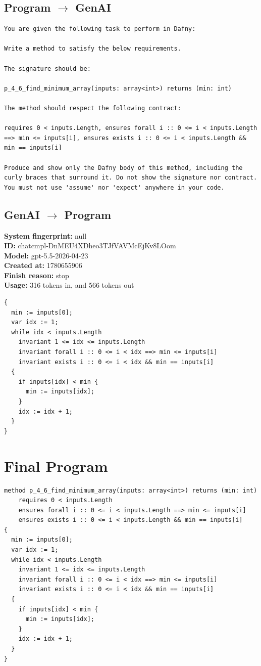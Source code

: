 \documentclass{article}
\begin{document}
\subsection*{Program $\rightarrow$ GenAI}
\begin{lstlisting}
You are given the following task to perform in Dafny:

Write a method to satisfy the below requirements.

The signature should be:

p_4_6_find_minimum_array(inputs: array<int>) returns (min: int)

The method should respect the following contract:

requires 0 < inputs.Length, ensures forall i :: 0 <= i < inputs.Length ==> min <= inputs[i], ensures exists i :: 0 <= i < inputs.Length && min == inputs[i]

Produce and show only the Dafny body of this method, including the curly braces that surround it. Do not show the signature nor contract. You must not use 'assume' nor 'expect' anywhere in your code.
\end{lstlisting}
\subsection*{GenAI $\rightarrow$ Program}
\textbf{System fingerprint: }null
\\\textbf{ID: }chatcmpl-DnMEU4XDheo3TJfVAVMcEjKv8LOom
\\\textbf{Model: }gpt-5.5-2026-04-23
\\\textbf{Created at: }1780655906
\\\textbf{Finish reason: }stop
\\\textbf{Usage: }316 tokens in, and 566 tokens out
\begin{lstlisting}
{
  min := inputs[0];
  var idx := 1;
  while idx < inputs.Length
    invariant 1 <= idx <= inputs.Length
    invariant forall i :: 0 <= i < idx ==> min <= inputs[i]
    invariant exists i :: 0 <= i < idx && min == inputs[i]
  {
    if inputs[idx] < min {
      min := inputs[idx];
    }
    idx := idx + 1;
  }
}
\end{lstlisting}
\section*{Final Program}
\begin{lstlisting}
method p_4_6_find_minimum_array(inputs: array<int>) returns (min: int)
	requires 0 < inputs.Length
	ensures forall i :: 0 <= i < inputs.Length ==> min <= inputs[i]
	ensures exists i :: 0 <= i < inputs.Length && min == inputs[i]
{
  min := inputs[0];
  var idx := 1;
  while idx < inputs.Length
    invariant 1 <= idx <= inputs.Length
    invariant forall i :: 0 <= i < idx ==> min <= inputs[i]
    invariant exists i :: 0 <= i < idx && min == inputs[i]
  {
    if inputs[idx] < min {
      min := inputs[idx];
    }
    idx := idx + 1;
  }
}
\end{lstlisting}
\end{document}
